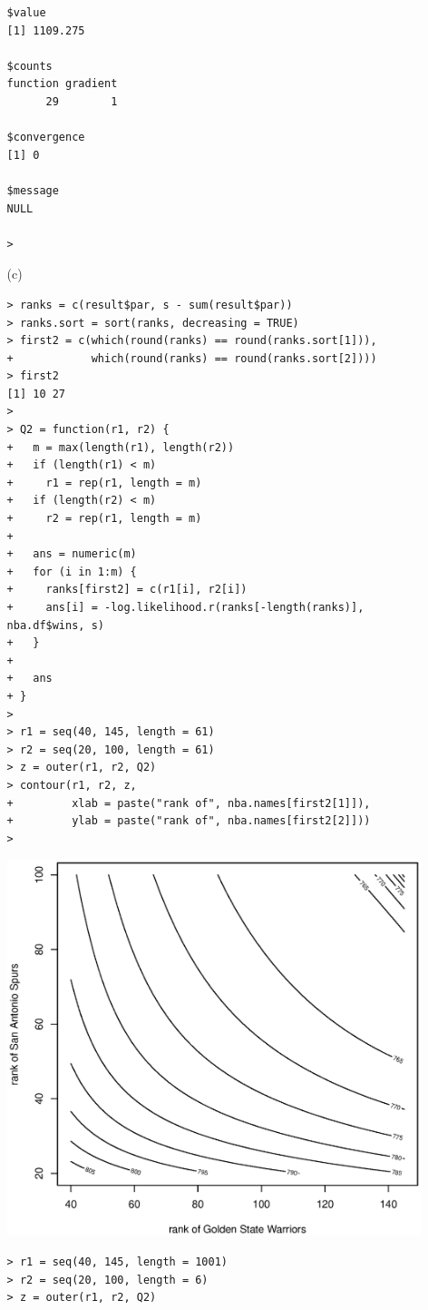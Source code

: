 \documentclass[11pt]{report}
\theoremstyle{definition}
\theoremstyle{remark}
\begin{document}
\begin{enumerate}
\begin{enumerate}
\begin{verbatim}
$value
[1] 1109.275

$counts
function gradient 
      29        1 

$convergence
[1] 0

$message
NULL

> \end{verbatim}
 	    \item[(c)] \begin{verbatim}> ranks = c(result$par, s - sum(result$par))
> ranks.sort = sort(ranks, decreasing = TRUE)
> first2 = c(which(round(ranks) == round(ranks.sort[1])), 
+            which(round(ranks) == round(ranks.sort[2])))
> first2
[1] 10 27
> 
> Q2 = function(r1, r2) {
+   m = max(length(r1), length(r2))
+   if (length(r1) < m)
+     r1 = rep(r1, length = m)
+   if (length(r2) < m)
+     r2 = rep(r1, length = m)
+   
+   ans = numeric(m)
+   for (i in 1:m) {
+     ranks[first2] = c(r1[i], r2[i])
+     ans[i] = -log.likelihood.r(ranks[-length(ranks)], nba.df$wins, s)
+   }
+   
+   ans
+ }
> 
> r1 = seq(40, 145, length = 61)
> r2 = seq(20, 100, length = 61)
> z = outer(r1, r2, Q2)
> contour(r1, r2, z,
+         xlab = paste("rank of", nba.names[first2[1]]),
+         ylab = paste("rank of", nba.names[first2[2]]))
> \end{verbatim}
    \includegraphics[width=\textwidth]{a2_contour.eps}
    \begin{verbatim}> r1 = seq(40, 145, length = 1001)
> r2 = seq(20, 100, length = 6)
> z = outer(r1, r2, Q2)

\end{verbatim}
\end{enumerate}
\end{enumerate}
\end{document}
